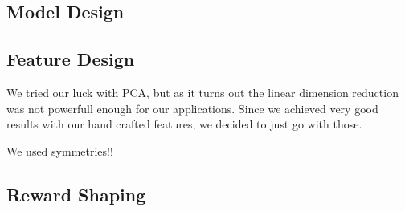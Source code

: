 \subsection{Model Design}

\subsection{Feature Design}
We tried our luck with PCA, but as it turns out the linear dimension reduction was not powerfull enough for our applications. Since we achieved very good results with our hand crafted features, we decided to just go with those.

We used symmetries!!

\subsection{Reward Shaping}